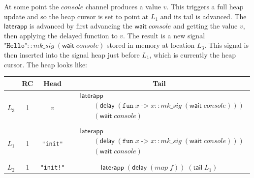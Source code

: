 At some point the $console$ channel produces a value $v$.
This triggers a full heap update and so the heap cursor is set to point at $L_1$ and its tail is advanced.
The $\mathsf{laterapp}$ is advanced by first advancing the $\mathsf{wait} \; console$ and getting the value $v$, then applying the delayed function to $v$. The result is a new signal $\texttt{"Hello"} :: mk\_sig \; (\mathsf{wait} \; console)$ stored in memory at location $L_3$. This signal is then inserted into the signal heap just before $L_1$, which is currently the heap cursor.
The heap looks like: 
\begin{center}
\begin{tabular}{ |c|c|c|c| } 
 \hline
  & RC & Head & Tail \\
 \hline
 $L_3$ & 1 & $v$ &
  $
  \begin{aligned}
      &\mathsf{laterapp} \\
      &\qquad (\mathsf{delay} \; (\texttt{fun} \; x \; \texttt{->} \; x :: mk\_sig \; (\mathsf{wait} \; console))) \\
      &\qquad (\mathsf{wait} \; console) \\
  \end{aligned}
  $ \\
 \hline
 $L_1$ & 1 & \texttt{"init"} &
  $
  \begin{aligned}
      &\mathsf{laterapp} \\
      &\qquad (\mathsf{delay} \; (\texttt{fun} \; x \; \texttt{->} \; x :: mk\_sig \; (\mathsf{wait} \; console))) \\
      &\qquad (\mathsf{wait} \; console) \\
  \end{aligned}
  $ \\
  \hline
  $L_2$ & 1 & \texttt{"init!"} &
  $\mathsf{laterapp}
    \; (\mathsf{delay} \; (map \; f))
    \; (\mathsf{tail} \; L_1)
  $ \\
 \hline
\end{tabular}
\end{center}

